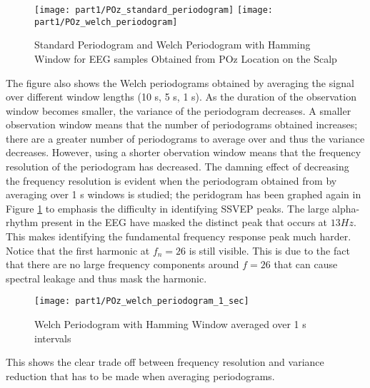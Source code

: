 \begin{figure}[H]
\centering{}
\texttt{[image: part1/POz\_standard\_periodogram]}
\texttt{[image: part1/POz\_welch\_periodogram]}
\caption{Standard Periodogram and Welch Periodogram with Hamming Window for EEG samples Obtained from POz Location on the Scalp}
\end{figure}

\noindent{}The figure also shows the Welch periodograms obtained by averaging the signal over different window lengths (10 s, 5 s, 1 s). As the duration of the observation window becomes smaller, the variance of the periodogram decreases. A smaller observation window means that the number of periodograms obtained increases; there are a greater number of periodograms to average over and thus the variance decreases. However, using a shorter obervation window means that the frequency resolution of the periodogram has decreased. The damning effect of decreasing the frequency resolution is evident when the periodogram obtained from by averaging over 1 s windows is studied; the peridogram has been graphed again in Figure \ref{fig:welch_1_sec} to emphasis the difficulty in identifying SSVEP peaks. The large alpha-rhythm present in the EEG have masked the distinct peak that occurs at $13 Hz$. This makes identifying the fundamental frequency response peak much harder. Notice that the first harmonic at $f_n=26$ is still visible. This is due to the fact that there are no large frequency components around $f=26$ that can cause spectral leakage and thus mask the harmonic.

\begin{figure}[H]
\centering{}
\texttt{[image: part1/POz\_welch\_periodogram\_1\_sec]}
\caption{Welch Periodogram with Hamming Window averaged over 1 s intervals}
\label{fig:welch_1_sec}
\end{figure}

\noindent{}This shows the clear trade off between frequency resolution and variance reduction that has to be made when averaging periodograms. 
